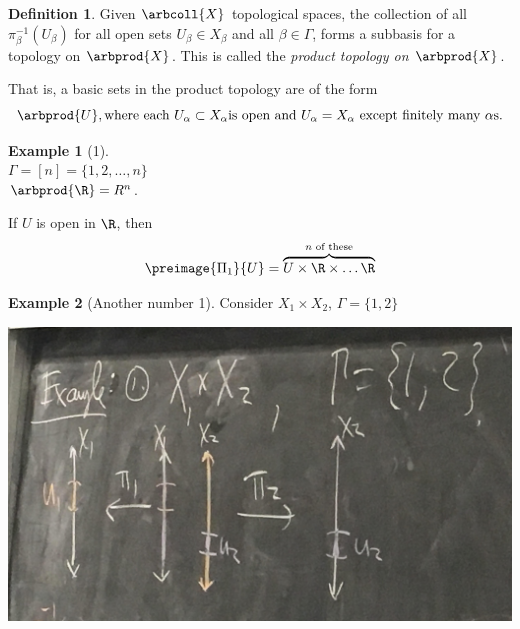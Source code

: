 \documentclass[a5paper]{article}
\theoremstyle{definition}%
\newtheorem*{definition*}{Definition}
\newtheorem*{example*}{Example}
\numberwithin{exercise}{section}
\theoremstyle{remark}%
\begin{document}
\begin{highlight}
\begin{definition*}
Given $\arbcoll{X}$ topological spaces, the collection of all $\pi^{-1}_\beta(U_\beta)$ for all open sets $U_\beta\in X_\beta$ and all $\beta\in\Gamma$, forms a subbasis for a topology on $\arbprod{X}$. This is called the \emph{product topology on $\arbprod{X}$}.
\end{definition*}
\end{highlight}
\begin{highlight}
That is, a basic sets in the product topology are of the form 
$$\arbprod{U}, \text{where each } U_\alpha\subset X_\alpha \text{is open and } U_\alpha=X_\alpha \text{ except finitely many } \alpha \text{s.}$$
\end{highlight}

\begin{example*}[1]\mbox{}\\
$\Gamma = [n] = \{1,2,\ldots, n\}$\\
$\arbprod{\R}=R^n$. 

If $U$ is open in $\R$, then 
$$\preimage{\Pi_1}{U}=\overbrace{U\times\R\times \ldots \R}^{n \text{ of these}}$$
\end{example*}

\begin{example*}[Another number 1]
Consider $X_1\times X_2$, $\Gamma=\{1,2\}$

\begin{center}
\includegraphics[scale=.08]{images/general_products1}
\end{center}

\end{example*}
\end{document}

